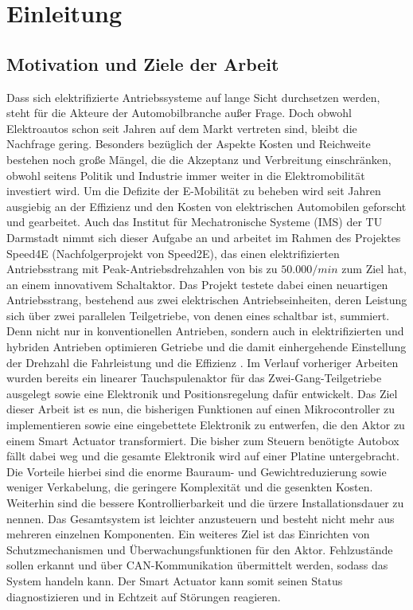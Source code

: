 \chapter{Einleitung}
\section{Motivation und Ziele der Arbeit}
Dass sich elektrifizierte Antriebssysteme auf lange Sicht durchsetzen werden, steht für die Akteure der Automobilbranche außer Frage. Doch obwohl Elektroautos schon seit Jahren auf dem Markt vertreten sind, bleibt die Nachfrage gering. Besonders bezüglich der Aspekte Kosten und Reichweite bestehen noch große Mängel, die die Akzeptanz und Verbreitung einschränken, obwohl seitens Politik und Industrie immer weiter in die Elektromobilität investiert wird. Um die Defizite der E-Mobilität zu beheben wird seit Jahren ausgiebig an der Effizienz und den Kosten von elektrischen Automobilen geforscht und gearbeitet.
Auch das Institut für Mechatronische Systeme (IMS) der TU Darmstadt nimmt sich dieser Aufgabe an und arbeitet im Rahmen des Projektes Speed4E (Nachfolgerprojekt von Speed2E), das einen elektrifizierten Antriebsstrang mit Peak-Antriebsdrehzahlen von bis zu $50.000/min$ zum Ziel hat, an einem innovativem Schaltaktor. Das Projekt testete dabei einen neuartigen Antriebsstrang, bestehend aus zwei elektrischen Antriebseinheiten, deren Leistung sich über zwei parallelen Teilgetriebe, von denen eines schaltbar ist, summiert. Denn nicht nur in konventionellen Antrieben, sondern auch in elektrifizierten und hybriden Antrieben optimieren Getriebe und die damit einhergehende Einstellung der Drehzahl die Fahrleistung und die Effizienz \cite{Tsch14}.
  Im Verlauf vorheriger Arbeiten wurden bereits ein linearer Tauchspulenaktor für das Zwei-Gang-Teilgetriebe ausgelegt sowie eine Elektronik und Positionsregelung dafür entwickelt. Das Ziel dieser Arbeit ist es nun, die bisherigen Funktionen auf einen Mikrocontroller zu implementieren sowie eine eingebettete Elektronik zu entwerfen, die den Aktor zu einem Smart Actuator transformiert. Die bisher zum Steuern benötigte Autobox fällt dabei weg und die gesamte Elektronik wird auf einer Platine untergebracht. Die Vorteile hierbei sind die enorme Bauraum- und Gewichtreduzierung sowie weniger Verkabelung, die geringere Komplexität und die gesenkten Kosten. Weiterhin sind die bessere Kontrollierbarkeit und die ürzere Installationsdauer zu nennen. Das Gesamtsystem ist leichter anzusteuern und besteht nicht mehr aus mehreren einzelnen Komponenten. Ein weiteres Ziel ist das Einrichten von Schutzmechanismen und Überwachungsfunktionen für den Aktor. Fehlzustände sollen erkannt und über CAN-Kommunikation übermittelt werden, sodass das System handeln kann. Der Smart Actuator kann somit seinen Status diagnostizieren und in Echtzeit auf Störungen reagieren.  

